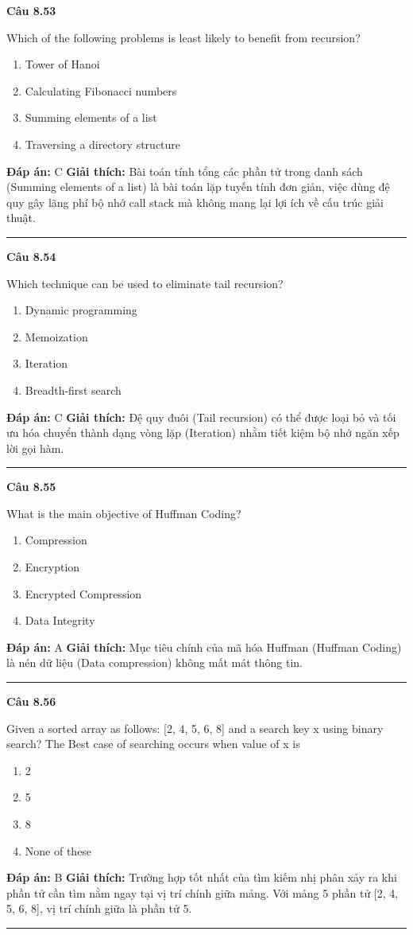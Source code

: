\documentclass[11pt,a4paper]{article}
\newenvironment{question}[1]{%
  \par\vspace{1em}\noindent\textbf{\large Câu #1}\par\vspace{0.4em}
}{%
  \par\vspace{1em}\hrule\vspace{0.6em}
}
\newenvironment{choices}{%
  \begin{enumerate}[label=\textbf{\Alph*.},leftmargin=2.2em,itemsep=2pt,topsep=3pt]
}{%
  \end{enumerate}
}
\newcommand{\choice}{\item}
\begin{document}
\begin{question}{8.53}
Which of the following problems is least likely to benefit from recursion?
\begin{choices}
\choice Tower of Hanoi
\choice Calculating Fibonacci numbers
\choice Summing elements of a list
\choice Traversing a directory structure
\end{choices}
\textbf{Đáp án:} C
\textbf{Giải thích:} Bài toán tính tổng các phần tử trong danh sách (Summing elements of a list) là bài toán lặp tuyến tính đơn giản, việc dùng đệ quy gây lãng phí bộ nhớ call stack mà không mang lại lợi ích về cấu trúc giải thuật.
\end{question}

\begin{question}{8.54}
Which technique can be used to eliminate tail recursion?
\begin{choices}
\choice Dynamic programming
\choice Memoization
\choice Iteration
\choice Breadth-first search
\end{choices}
\textbf{Đáp án:} C
\textbf{Giải thích:} Đệ quy đuôi (Tail recursion) có thể được loại bỏ và tối ưu hóa chuyển thành dạng vòng lặp (Iteration) nhằm tiết kiệm bộ nhớ ngăn xếp lời gọi hàm.
\end{question}

\begin{question}{8.55}
What is the main objective of Huffman Coding?
\begin{choices}
\choice Compression
\choice Encryption
\choice Encrypted Compression
\choice Data Integrity
\end{choices}
\textbf{Đáp án:} A
\textbf{Giải thích:} Mục tiêu chính của mã hóa Huffman (Huffman Coding) là nén dữ liệu (Data compression) không mất mát thông tin.
\end{question}

\begin{question}{8.56}
Given a sorted array as follows: [2, 4, 5, 6, 8] and a search key x using binary search? The Best case of searching occurs when value of x is
\begin{choices}
\choice 2
\choice 5
\choice 8
\choice None of these
\end{choices}
\textbf{Đáp án:} B
\textbf{Giải thích:} Trường hợp tốt nhất của tìm kiếm nhị phân xảy ra khi phần tử cần tìm nằm ngay tại vị trí chính giữa mảng. Với mảng 5 phần tử [2, 4, 5, 6, 8], vị trí chính giữa là phần tử 5.
\end{question}
\end{document}
